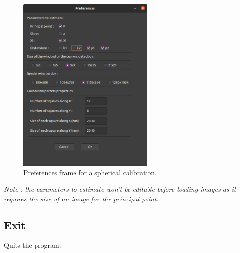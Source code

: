 \documentclass{article}
\begin{document}
\begin{figure}[H]
\centering
\includegraphics[width=0.6\textwidth]{pref.png}
\caption{\label{fig:pref}Preferences frame for a spherical calibration.}
\end{figure}

\textit{Note : the parameters to estimate won't be editable before loading images as it requires the size of an image for the principal point.}


\subsection{Exit}

Quits the program.
\end{document}
